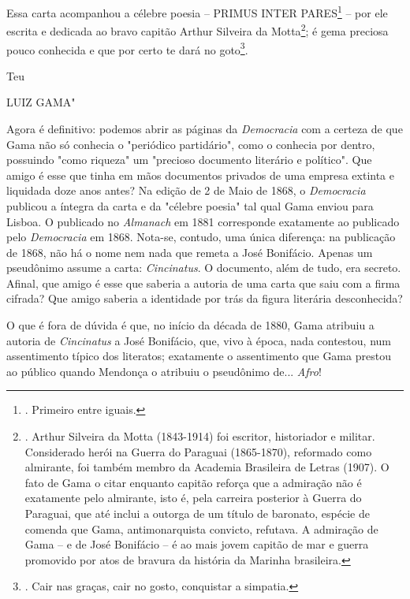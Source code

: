Essa carta acompanhou a célebre poesia -- PRIMUS INTER PARES\footnote{.
  Primeiro entre iguais.} -- por ele escrita e dedicada ao bravo capitão
Arthur Silveira da Motta\footnote{. Arthur Silveira da Motta (1843-1914)
  foi escritor, historiador e militar. Considerado herói na Guerra do
  Paraguai (1865-1870), reformado como almirante, foi também membro da
  Academia Brasileira de Letras (1907). O fato de Gama o citar enquanto
  capitão reforça que a admiração não é exatamente pelo almirante, isto
  é, pela carreira posterior à Guerra do Paraguai, que até inclui a
  outorga de um título de baronato, espécie de comenda que Gama,
  antimonarquista convicto, refutava. A admiração de Gama -- e de José
  Bonifácio -- é ao mais jovem capitão de mar e guerra promovido por
  atos de bravura da história da Marinha brasileira.}; é gema preciosa
pouco conhecida e que por certo te dará no goto\footnote{. Cair nas
  graças, cair no gosto, conquistar a simpatia.}.

Teu

LUIZ GAMA"

Agora é definitivo: podemos abrir as páginas da \emph{Democracia} com a
certeza de que Gama não só conhecia o "periódico partidário", como o
conhecia por dentro, possuindo "como riqueza" um "precioso documento
literário e político". Que amigo é esse que tinha em mãos documentos
privados de uma empresa extinta e liquidada doze anos antes? Na edição
de 2 de Maio de 1868, o \emph{Democracia} publicou a íntegra da carta e
da "célebre poesia" tal qual Gama enviou para Lisboa. O publicado no
\emph{Almanach} em 1881 corresponde exatamente ao publicado pelo
\emph{Democracia} em 1868. Nota-se, contudo, uma única diferença: na
publicação de 1868, não há o nome nem nada que remeta a José Bonifácio.
Apenas um pseudônimo assume a carta: \emph{Cincinatus}. O documento,
além de tudo, era secreto. Afinal, que amigo é esse que saberia a
autoria de uma carta que saiu com a firma cifrada? Que amigo saberia a
identidade por trás da figura literária desconhecida?

O que é fora de dúvida é que, no início da década de 1880, Gama atribuiu
a autoria de \emph{Cincinatus} a José Bonifácio, que, vivo à época, nada
contestou, num assentimento típico dos literatos; exatamente o
assentimento que Gama prestou ao público quando Mendonça o atribuiu o
pseudônimo de... \emph{Afro}!

